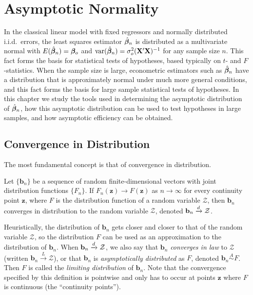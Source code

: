 \chapter{Asymptotic Normality}\label{ch:asymptotic-normality}

In the classical linear model with fixed regressors and normally distributed
i.i.d.\ errors, the least squares estimator $\hat{\boldsymbol{\beta}}_n$ is distributed as a multivariate
normal with $E(\hat{\boldsymbol{\beta}}_n) = \boldsymbol{\beta}_o$ and $\mathrm{var}(\hat{\boldsymbol{\beta}}_n) = \sigma_o^2(\mathbf{X}'\mathbf{X})^{-1}$ for any sample size
$n$. This fact forms the basis for statistical tests of hypotheses, based typically on $t$- and $F$-statistics. When the sample size is large, econometric
estimators such as $\hat{\boldsymbol{\beta}}_n$ have a distribution that is approximately normal
under much more general conditions, and this fact forms the basis for large
sample statistical tests of hypotheses. In this chapter we study the tools
used in determining the asymptotic distribution of $\hat{\boldsymbol{\beta}}_n$, how this asymptotic distribution can be used to test hypotheses in large samples, and how
asymptotic efficiency can be obtained.

\section{Convergence in Distribution}\label{sec:convergence-distribution}

The most fundamental concept is that of convergence in distribution.

\begin{definition}\label{def:4.1}
Let $\{\mathbf{b}_n\}$ be a sequence of random finite-dimensional vectors with joint distribution functions $\{F_n\}$. If $F_n(\mathbf{z}) \to F(\mathbf{z})$ as $n \to \infty$ for every continuity point $\mathbf{z}$, where $F$ is the distribution function of a random variable $\mathcal{Z}$, then $\mathbf{b}_n$ converges in distribution to the random variable $\mathcal{Z}$, denoted $\mathbf{b}_n \xrightarrow{d} \mathcal{Z}$.
\end{definition}

Heuristically, the distribution of $\mathbf{b}_n$ gets closer and closer to that of the
random variable $\mathcal{Z}$, so the distribution $F$ can be used as an approximation
to the distribution of $\mathbf{b}_n$. When $\mathbf{b}_n \xrightarrow{d} \mathcal{Z}$, we also say that $\mathbf{b}_n$ \emph{converges in
law} to $\mathcal{Z}$ (written $\mathbf{b}_n \xrightarrow{L} \mathcal{Z}$), or that $\mathbf{b}_n$ is \emph{asymptotically distributed} as
$F$, denoted $\mathbf{b}_n \overset{A}{\sim} F$. Then $F$ is called the \emph{limiting distribution} of $\mathbf{b}_n$. Note
that the convergence specified by this definition is pointwise and only has
to occur at points $\mathbf{z}$ where $F$ is continuous (the ``continuity points'').

